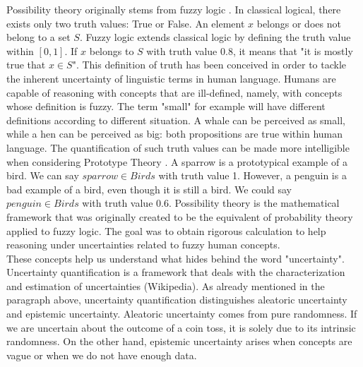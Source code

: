 \documentclass[12pt,a4paper]{article}
\theoremstyle{definition}
\theoremstyle{plain}
\begin{document}
Possibility theory originally stems from fuzzy logic \cite{zadeh1978}. In classical logical, there exists only two truth values: True or False. An element $x$ belongs or does not belong to a set $S$. Fuzzy logic extends classical logic by defining the truth value within $[0,1]$. If $x$ belongs to $S$ with truth value 0.8, it means that "it is mostly true that $x \in S$". This definition of truth has been conceived in order to tackle the inherent uncertainty of linguistic terms in human language. Humans are capable of reasoning with concepts that are ill-defined, namely, with concepts whose definition is fuzzy. The term "small" for example will have different definitions according to different situation. A whale can be perceived as small, while a hen can be perceived as big: both propositions are true within human language. The quantification of such truth values can be made more intelligible when considering Prototype Theory \cite{rosch1973}. A sparrow is a prototypical example of a bird. We can say $ sparrow \in Birds$ with truth value 1. However, a penguin is a bad example of a bird, even though it is still a bird. We could say $penguin \in Birds$ with truth value 0.6. Possibility theory is the mathematical framework that was originally created to be the equivalent of probability theory applied to fuzzy logic. The goal was to obtain rigorous calculation to help reasoning under uncertainties related to fuzzy human concepts. \\


\noindent These concepts help us understand what hides behind the word "uncertainty". Uncertainty quantification is a framework that deals with the characterization and estimation of uncertainties (Wikipedia). As already mentioned in the paragraph above, uncertainty quantification distinguishes aleatoric uncertainty and epistemic uncertainty. Aleatoric uncertainty comes from pure randomness. If we are uncertain about the outcome of a coin toss, it is solely due to its intrinsic randomness. On the other hand, epistemic uncertainty arises when concepts are vague or when we do not have enough data. \\ 
\end{document}
